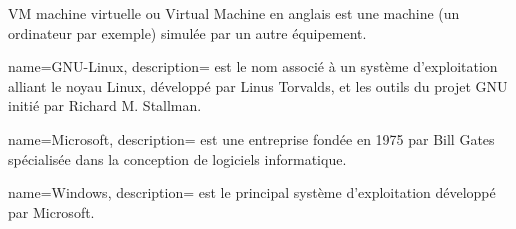 


    {VM}
    {machine virtuelle}
    { ou Virtual Machine en anglais est une machine (un ordinateur par exemple) simulée par un autre équipement.}
    

{
        name=GNU-Linux,
        description={ est le nom associé à un système d'exploitation alliant le noyau Linux, développé par Linus Torvalds, et les outils du projet GNU initié par Richard M. Stallman.}
}

{
        name=Microsoft,
        description={ est une entreprise fondée en 1975 par Bill Gates spécialisée dans la conception de logiciels informatique.}
}

{
        name=Windows,
        description={ est le principal système d'exploitation développé par Microsoft.}
}

 
